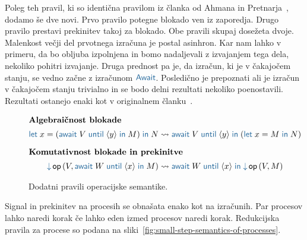 Poleg teh pravil, ki so identična pravilom iz članka od Ahmana in Pretnarja~\cite{aeff}, dodamo še dve novi.
Prvo pravilo potegne blokado ven iz zaporedja. Drugo pravilo prestavi prekinitev takoj za blokado. Obe pravili skupaj dosežeta dvoje. Malenkost večji del prvotnega izračuna je postal asinhron. Kar nam lahko v primeru, da bo obljuba izpolnjena in bomo nadaljevali z izvajanjem tega dela, nekoliko pohitri izvajanje. Druga prednost pa je, da izračun, ki je v čakajočem stanju, se vedno začne z izračunom $\tmkw{Await}$. Posledično je prepoznati ali je izračun v čakajočem stanju trivialno in se bodo delni rezultati nekoliko poenostavili. 
Rezultati ostanejo enaki kot v originalnem članku~\cite{aeff}.


\begin{figure}[H]
	\centering
	\small
	\begin{align*}
		\intertext{\textbf{Algebraičnost blokade}}
		\tmlet{x}{(\tmawait{V}{y}{M})}{N} & \reduces \tmawait{V}{y}{(\tmlet{x}{M}{N})}
		\\[1ex]
		\intertext{\textbf{Komutativnost blokade in prekinitve}}
		\tmopin{op}{V}{\tmawait{W}{x}{M}} &\reduces \tmawait{W}{x}{\tmopin{op}{V}{M}}
	\end{align*}
	
	\caption{Dodatni pravili operacijske semantike.}
	\label{fig:operacijska-semantika-poenostavitev}
\end{figure}

Signal in prekinitev na procesih se obnašata enako kot na izračunih. Par procesov lahko naredi korak če lahko eden izmed procesov naredi korak. Redukcijska pravila za procese so podana na sliki~\ref{fig:small-step-semantics-of-processes}.


